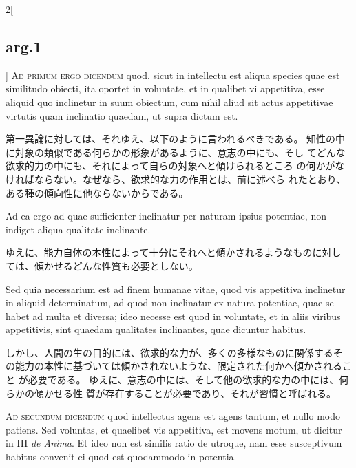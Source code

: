 \documentclass[paper=a4paper,fontsize=10pt,jafontsize=9pt,titlepage]{jlreq}
\begin{document}
\begin{paracol}{2}[\subsection{arg.1}]
{\scshape Ad primum ergo dicendum} quod, sicut in intellectu est aliqua species
 quae est similitudo obiecti, ita oportet in voluntate, et in qualibet
 vi appetitiva, esse aliquid quo inclinetur in suum obiectum, cum
 nihil aliud sit actus appetitivae virtutis quam inclinatio quaedam,
 ut supra dictum est.

\switchcolumn

第一異論に対しては、それゆえ、以下のように言われるべきである。
知性の中に対象の類似である何らかの形象があるように、意志の中にも、そし
 てどんな欲求的力の中にも、それによって自らの対象へと傾けられるところ
 の何かがなければならない。なぜなら、欲求的な力の作用とは、前に述べら
 れたとおり、ある種の傾向性に他ならないからである。

\switchcolumn*

Ad ea ergo ad quae sufficienter inclinatur per
naturam ipsius potentiae, non indiget aliqua qualitate
 inclinante.

\switchcolumn

ゆえに、能力自体の本性によって十分にそれへと傾かされるようなものに対し
 ては、傾かせるどんな性質も必要としない。

\switchcolumn*

Sed quia necessarium est ad finem humanae vitae, quod vis appetitiva
inclinetur in aliquid determinatum, ad quod non inclinatur ex natura
potentiae, quae se habet ad multa et diversa; ideo necesse est quod in
voluntate, et in aliis viribus appetitivis, sint quaedam qualitates
inclinantes, quae dicuntur habitus.

\switchcolumn

しかし、人間の生の目的には、欲求的な力が、多くの多様なものに関係するそ
 の能力の本性に基づいては傾かされないような、限定された何かへ傾かされること
 が必要である。
ゆえに、意志の中には、そして他の欲求的な力の中には、何らかの傾かせる性
 質が存在することが必要であり、それが習慣と呼ばれる。

\switchcolumn*[\subsection{ad.2}]

{\scshape Ad secundum dicendum} quod intellectus agens est agens tantum, et nullo
 modo patiens. Sed voluntas, et quaelibet vis appetitiva, est movens
 motum, ut dicitur in III {\itshape de Anima}. Et ideo non est similis ratio de
 utroque, nam esse susceptivum habitus convenit ei quod est quodammodo
 in potentia.

\switchcolumn


\end{paracol}
\end{document}

